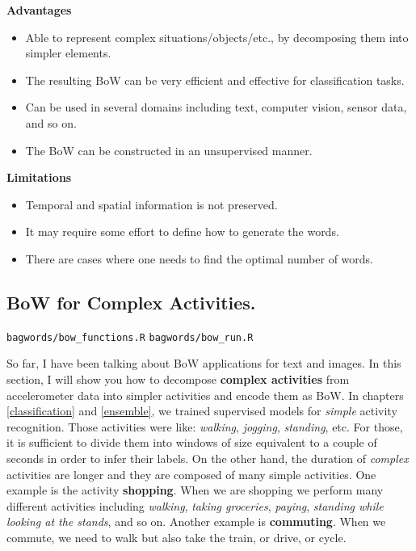 \documentclass[
  11pt,
]{krantz}
\makeatletter
\newenvironment{kframe}{%
\medskip{}
\setlength{\fboxsep}{.8em}
 \def\at@end@of@kframe{}%
 \ifinner\ifhmode%
  \def\at@end@of@kframe{\end{minipage}}%
  \begin{minipage}{\columnwidth}%
 \fi\fi%
 \def\FrameCommand##1{\hskip\@totalleftmargin \hskip-\fboxsep
 \colorbox{shadecolor}{##1}\hskip-\fboxsep
     \hskip-\linewidth \hskip-\@totalleftmargin \hskip\columnwidth}%
 \MakeFramed {\advance\hsize-\width
   \@totalleftmargin\z@ \linewidth\hsize
   \@setminipage}}%
 {\par\unskip\endMakeFramed%
 \at@end@of@kframe}
\newenvironment{rmdblock}[1]
  {
  \begin{itemize}
  \renewcommand{\labelitemi}{
    \raisebox{-.7\height}[0pt][0pt]{
      {\setkeys{Gin}{width=3em,keepaspectratio}\texttt{[image: images/icons/\#1]}}
    }
  }
  \setlength{\fboxsep}{1em}
  \begin{kframe}
  \item
  }
  {
  \end{kframe}
  \end{itemize}
  }
\newenvironment{rmdfolder}
  {\begin{rmdblock}{folder}}
  {\end{rmdblock}}
\makeatother
\begin{document}
\textbf{Advantages}

\begin{itemize}
\item
  Able to represent complex situations/objects/etc., by decomposing them into simpler elements.
\item
  The resulting BoW can be very efficient and effective for classification tasks.
\item
  Can be used in several domains including text, computer vision, sensor data, and so on.
\item
  The BoW can be constructed in an unsupervised manner.
\end{itemize}

\textbf{Limitations}

\begin{itemize}
\item
  Temporal and spatial information is not preserved.
\item
  It may require some effort to define how to generate the words.
\item
  There are cases where one needs to find the optimal number of words.
\end{itemize}

\hypertarget{bow-for-complex-activities.}{%
\subsection{BoW for Complex Activities.}\label{bow-for-complex-activities.}}

\begin{rmdfolder}
\texttt{bagwords/bow\_functions.R} \texttt{bagwords/bow\_run.R}
\end{rmdfolder}

So far, I have been talking about BoW applications for text and images. In this section, I will show you how to decompose \textbf{complex activities} from accelerometer data into simpler activities and encode them as BoW. In chapters \ref{classification} and \ref{ensemble}, we trained supervised models for \emph{simple} activity recognition. Those activities were like: \emph{walking}, \emph{jogging}, \emph{standing}, etc. For those, it is sufficient to divide them into windows of size equivalent to a couple of seconds in order to infer their labels. On the other hand, the duration of \emph{complex} activities are longer and they are composed of many simple activities. One example is the activity \textbf{shopping}. When we are shopping we perform many different activities including \emph{walking}, \emph{taking groceries}, \emph{paying}, \emph{standing while looking at the stands}, and so on. Another example is \textbf{commuting}. When we commute, we need to walk but also take the train, or drive, or cycle.
\end{document}
